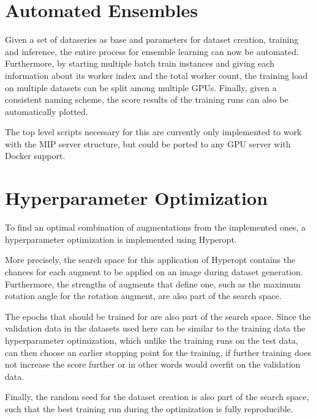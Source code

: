 \documentclass[10pt]{book}
\begin{document}

\section{Automated Ensembles}

Given a set of dataseries as base and parameters for dataset creation, training and inference, the entire process for ensemble learning can now be automated. Furthermore, by starting multiple batch train instances and giving each information about its worker index and the total worker count, the training load on multiple datasets can be split among multiple \acp{GPU}. Finally, given a consistent naming scheme, the score results of the training runs can also be automatically plotted.

The top level scripts necessary for this are currently only implemented to work with the \ac{MIP} server structure, but could be ported to any \ac{GPU} server with Docker support.

\section{Hyperparameter Optimization}
\label{sec:hyper_opt}

To find an optimal combination of augmentations from the implemented ones, a hyperparameter optimization is implemented using Hyperopt. 

More precisely, the search space for this application of Hyperopt contains the chances for each augment to be applied on an image during dataset generation. Furthermore, the strengths of augments that define one, such as the maximum rotation angle for the rotation augment, are also part of the search space. 

The epochs that should be trained for are also part of the search space. Since the validation data in the datasets used here can be similar to the training data the hyperparameter optimization, which unlike the training runs on the test data, can then choose an earlier stopping point for the training, if further training does not increase the score further or in other words would overfit on the validation data. 

Finally, the random seed for the dataset creation is also part of the search space, such that the best training run during the optimization is fully reproducible.
\end{document}

